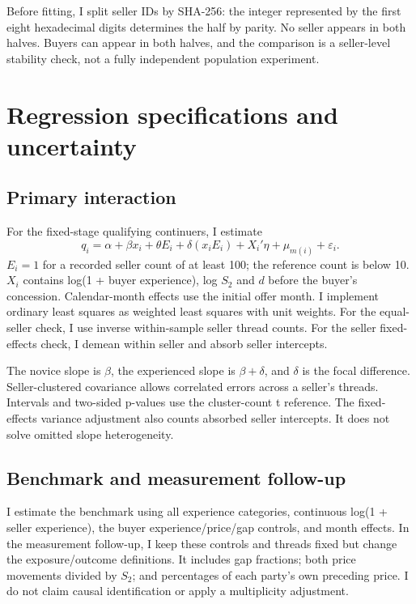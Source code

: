 \documentclass[11pt,a4paper]{article}
\begin{document}
Before fitting, I split seller IDs by SHA-256: the integer represented by
the first eight hexadecimal digits determines the half by parity. No seller
appears in both halves. Buyers can appear in both halves, and the comparison
is a seller-level stability check, not a fully independent population experiment.

\section{Regression specifications and uncertainty}
\subsection{Primary interaction}
For the fixed-stage qualifying continuers, I estimate
\begin{equation}
q_i=\alpha+\beta x_i+\theta E_i+\delta(x_iE_i)
+X_i'\eta+\mu_{m(i)}+\varepsilon_i.\label{eq:primary}
\end{equation}
$E_i=1$ for a recorded seller count of at least 100; the reference count is
below 10. $X_i$ contains log(1 + buyer experience), log $S_2$ and $d$ before
the buyer's concession. Calendar-month effects use the initial offer month.
I implement ordinary least squares as weighted least squares with unit
weights. For the equal-seller check, I use inverse within-sample seller thread
counts. For the seller fixed-effects check, I demean within seller and absorb
seller intercepts.

The novice slope is $\beta$, the experienced slope is $\beta+\delta$, and
$\delta$ is the focal difference. Seller-clustered covariance allows correlated
errors across a seller's threads. Intervals and two-sided p-values use the
cluster-count t reference. The fixed-effects variance adjustment also counts
absorbed seller intercepts. It does not solve omitted slope heterogeneity.

\subsection{Benchmark and measurement follow-up}
I estimate the benchmark using all experience categories, continuous log(1 + seller
experience), the buyer experience/price/gap controls, and month effects.
In the measurement follow-up, I keep these controls and threads fixed but change
the exposure/outcome definitions. It includes gap fractions; both price
movements divided by $S_2$; and percentages of each party's own preceding price.
I do not claim causal identification or apply a multiplicity adjustment.
\end{document}
